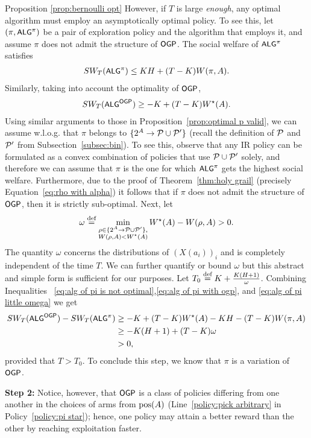 \begin{proofof}{Proposition \ref{prop:bernoulli opt}}
However, if $T$ is large \textit{enough}, any optimal algorithm must employ an asymptotically optimal policy. To see this, let $(\pi,{\small\textnormal{\textsf{ALG}}}^{\pi})$ be a pair of exploration policy and the algorithm that employs it, and assume $\pi$ does not admit the structure of ${\small\textnormal{\textsf{OGP}}}$. The social welfare of ${\small\textnormal{\textsf{ALG}}}^\pi$ satisfies
\begin{align}\label{eq:alg of pi is not optimal}
SW_T({\small\textnormal{\textsf{ALG}}}^\pi) \leq KH+ (T-K)W(\pi,A).    
\end{align}
Similarly, taking into account the optimality of ${\small\textnormal{\textsf{OGP}}}$,
\begin{align}\label{eq:alg of pi with ogp}
SW_T({\small\textnormal{\textsf{ALG}}}^{{\small\textnormal{\textsf{OGP}}}}) \geq -K +(T-K)W^\star(A).
\end{align}
Using similar arguments to those in Proposition~\ref{prop:optimal p valid}, we can assume w.l.o.g. that $\pi$ belongs to $\{2^A \rightarrow \mathcal{P} \cup \mathcal{P}'\}$ (recall the definition of $\mathcal{P}$ and $\mathcal{P}'$ from Subsection~\ref{subsec:bin}). To see this, observe that any IR policy can be formulated as a convex combination of policies that use $\mathcal{P} \cup \mathcal{P}'$ solely, and therefore we can assume that $\pi$ is the one for which ${\small\textnormal{\textsf{ALG}}}^{\pi}$ gets the highest social welfare. Furthermore, due to the proof of Theorem~\ref{thm:holy grail} (precisely Equation~\eqref{eq:rho with alpha}) it follows that if $\pi$ does not admit the structure of ${\small\textnormal{\textsf{OGP}}}$, then it is strictly sub-optimal. Next, let
\begin{align}\label{eq:alg of pi little omega}
\omega  \stackrel{\text{def}}{=} \min_{\substack{\rho \in \{2^A \rightarrow \mathcal{P} \cup \mathcal{P}'\},\\W(\rho, A) < W^\star(A)}} W^\star(A) - W(\rho,A) > 0.
\end{align}
The quantity $\omega$ concerns the distributions of $(X(a_i))_i$ and is completely independent of the time $T$. We can further quantify or bound $\omega$ but this abstract and simple form is sufficient for our purposes. Let $T_0 \stackrel{\text{def}}{=} K + \frac{K(H+1)}{\omega}$. Combining Inequalities~ \eqref{eq:alg of pi is not optimal},\eqref{eq:alg of pi with ogp}, and \eqref{eq:alg of pi little omega} we get
\begin{align*}
SW_T({\small\textnormal{\textsf{ALG}}}^{{\small\textnormal{\textsf{OGP}}}})-SW_T({\small\textnormal{\textsf{ALG}}}^\pi) &\geq  -K +(T-K)W^\star(A) - KH - (T-K)W(\pi,A) \\
& \geq -K(H+1) + (T-K)\omega\\
& > 0,
\end{align*}
provided that $T>T_0$. To conclude this step, we know that $\pi$ is a variation of ${\small\textnormal{\textsf{OGP}}}$.

\textbf{Step 2:}
Notice, however, that ${\small\textnormal{\textsf{OGP}}}$ is a class of policies differing from one another in the choices of arms from $\textnormal{pos}(A)$ (Line~\ref{policy:pick arbitrary} in Policy~\ref{policy:pi star}); hence, one policy may attain a better reward than the other by reaching exploitation faster. 


\end{proofof}
